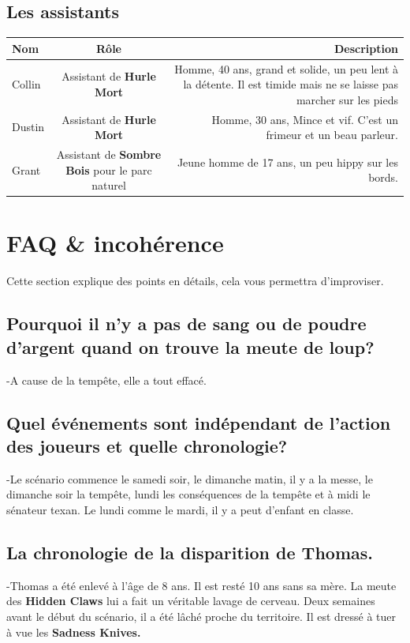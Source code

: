 \documentclass[oneside,12pt]{book}
\newcommand{\Peter}{\textbf{Hurle Mort} }
\newcommand{\Leonard}{\textbf{Sombre Bois} }
\begin{document}
\begin{flushleft}
\subsection{Les assistants}
\begin{tabular}{|l|c|r|}
\hline
Nom & Rôle & Description \\
\hline
Collin & Assistant de \Peter & Homme, 40 ans, grand et solide, un peu lent à la détente. Il est timide mais ne se laisse pas marcher sur les pieds\\
Dustin & Assistant de \Peter & Homme, 30 ans, Mince et vif. C'est un frimeur et un beau parleur.\\
Grant & Assistant de \Leonard pour le parc naturel & Jeune homme de 17 ans, un peu hippy sur les bords.  \\
\hline
\end{tabular}

\clearpage

\section{FAQ \& incohérence}
Cette section explique des points en détails, cela vous permettra d'improviser.
\subsection{Pourquoi il n'y a pas de sang ou de poudre d'argent quand on trouve la meute de loup?}
-A cause de la tempête, elle a tout effacé. 
\subsection{Quel événements sont indépendant de l'action des joueurs et quelle chronologie?}
-Le scénario commence le samedi soir, le dimanche matin, il y a la messe, le dimanche soir la tempête, lundi les conséquences de la tempête et à midi le sénateur texan. Le lundi comme le mardi, il y a peut d'enfant en classe. 
\subsection{La chronologie de la disparition de Thomas.} 
-Thomas a été enlevé à l'âge de 8 ans. Il est resté 10 ans sans sa mère. La meute des \textbf{Hidden Claws} lui a fait un véritable lavage de cerveau. Deux semaines avant le début du scénario, il a été lâché proche du territoire. Il est dressé à tuer à vue les \textbf{Sadness Knives.}

\clearpage


\end{flushleft}
\end{document}

